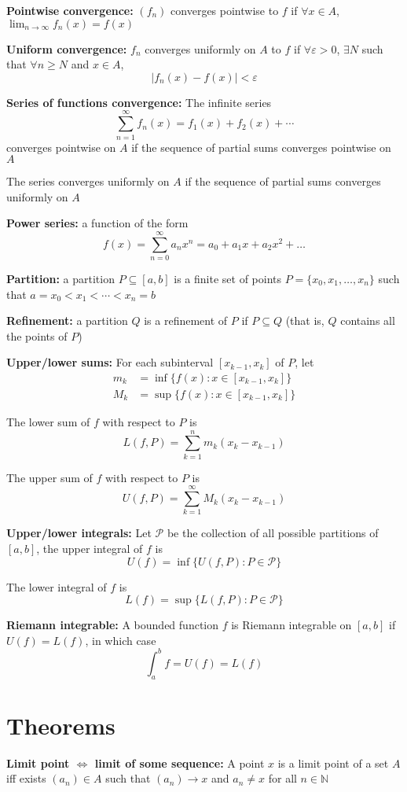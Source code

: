 \documentclass[12pt]{article}
\newcommand{\N}{\mathbb{N}}
\newcommand{\abs}[1]{\left\vert #1 \right\vert}
\newcommand{\ep}{\varepsilon}
\begin{document}
    \textbf{Pointwise convergence:} $(f_n)$ converges pointwise to $f$ if $\forall x \in A$, $\lim_{n \to \infty} f_n(x) = f(x)$

    \textbf{Uniform convergence:} $f_n$ converges uniformly on $A$ to $f$ if $\forall \ep > 0$, $\exists N$ such that $\forall n \geq N$ and $x \in A$, 
    \[\abs{f_n(x) - f(x)} < \ep\]

    \textbf{Series of functions convergence:} The infinite series 
    \[\sum_{n=1}^{\infty} f_n(x) = f_1(x) + f_2(x) + \cdots\]
    converges pointwise on $A$ if the sequence of partial sums converges pointwise on $A$

    The series converges uniformly on $A$ if the sequence of partial sums converges uniformly on $A$

    \textbf{Power series:} a function of the form 
    \[f(x) = \sum_{n=0}^{\infty} a_nx^n = a_0 + a_1 x + a_2x^2 + \dots\]

    \textbf{Partition:} a partition $P \subseteq [a, b]$ is a finite set of points $P = \{x_0, x_1, \dots, x_n\}$ such that $a = x_0 < x_1 < \cdots < x_n = b$

    \textbf{Refinement:} a partition $Q$ is a refinement of $P$ if $P \subseteq Q$ (that is, $Q$ contains all the points of $P$)

    \textbf{Upper/lower sums:} For each subinterval $[x_{k-1}, x_k]$ of $P$, let 
    \begin{align*}
        m_k &= \inf\{f(x): x \in [x_{k-1}, x_k]\} \\
        M_k &= \sup\{f(x): x \in [x_{k-1}, x_k]\}
    \end{align*}

    The lower sum of $f$ with respect to $P$ is 
    \[L(f, P) = \sum_{k=1}^n m_k(x_k - x_{k-1})\]

    The upper sum of $f$ with respect to $P$ is 
    \[U(f, P) = \sum_{k=1}^{\infty} M_k(x_k - x_{k-1})\]

    \textbf{Upper/lower integrals:} Let $\mathcal{P}$ be the collection of all possible partitions of $[a, b]$, the upper integral of $f$ is
    \[U(f) = \inf\{U(f, P): P \in \mathcal{P}\}\]

    The lower integral of $f$ is 
    \[L(f) = \sup\{L(f, P): P \in \mathcal{P}\}\]

    \textbf{Riemann integrable:} A bounded function $f$ is Riemann integrable on $[a, b]$ if $U(f) = L(f)$, in which case 
    \[\int_a^b f = U(f) = L(f)\]

\pagebreak
\section{Theorems}
    \textbf{Limit point $\iff$ limit of some sequence:} A point $x$ is a limit point of a set $A$ iff exists $(a_n) \in A$ such that $(a_n) \to x$ and $a_n \neq x$ for all $n \in \N$ 
\end{document}
